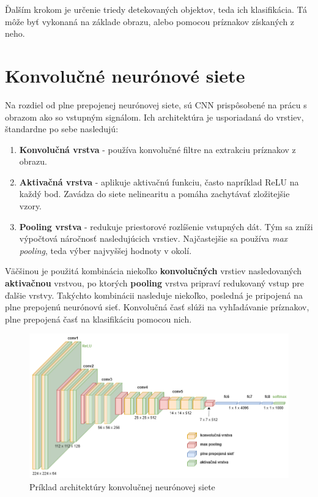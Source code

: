     Ďalším krokom je určenie triedy detekovaných objektov, teda ich klasifikácia. Tá môže byť vykonaná na základe obrazu, alebo pomocou príznakov získaných z neho.

    \section{Konvolučné neurónové siete}

        Na rozdiel od plne prepojenej neurónovej siete, sú \ac{CNN} prispôsobené na prácu s obrazom ako so vstupným signálom. Ich architektúra je usporiadaná do vrstiev, štandardne po sebe nasledujú:

        \begin{enumerate}
            \item \textbf{Konvolučná vrstva} - používa konvolučné filtre na extrakciu príznakov z obrazu.
            \item \textbf{Aktivačná vrstva} - aplikuje aktivačnú funkciu, často napríklad \ac{ReLU} na každý bod. Zavádza do siete nelinearitu a pomáha zachytávať zložitejšie vzory.
            \item \textbf{Pooling vrstva} - redukuje priestorové rozlíšenie vstupných dát. Tým sa zníži výpočtová náročnosť nasledujúcich vrstiev. Najčastejšie sa používa \emph{max pooling}, teda výber najvyššej hodnoty v okolí.
        \end{enumerate}

        Väčšinou je použitá kombinácia niekoľko \textbf{konvolučných} vrstiev nasledovaných \textbf{aktivačnou} vrstvou, po ktorých \textbf{pooling} vrstva pripraví redukovaný vstup pre ďalšie vrstvy. Takýchto kombinácii nasleduje niekoľko, posledná je pripojená na plne prepojenú neurónovú sieť. Konvolučná časť slúži na vyhľadávanie príznakov, plne prepojená časť na klasifikáciu pomocou nich.

        \begin{figure}[h]
            \centering
            \includegraphics[width=.9\textwidth]{obrazky/cnn/cnn.png}
            \caption{Príklad architektúry konvolučnej neurónovej siete}
        \end{figure}

